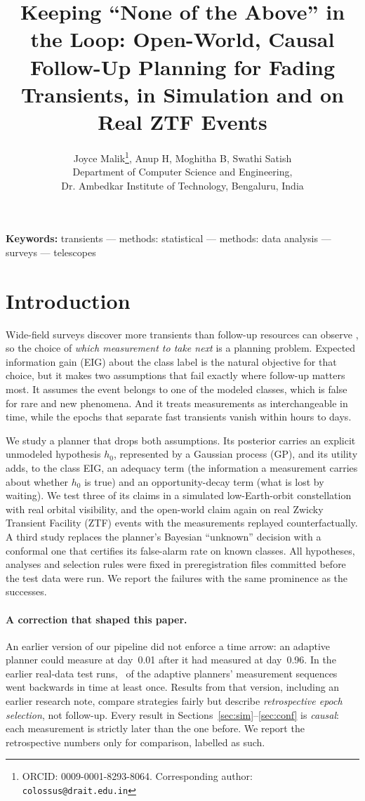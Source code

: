 \documentclass[12pt]{article}
\title{Keeping ``None of the Above'' in the Loop: Open-World, Causal Follow-Up Planning for Fading Transients, in Simulation and on Real ZTF Events}
\author{Joyce Malik\thanks{ORCID: 0009-0001-8293-8064. Corresponding author: \texttt{colossus@drait.edu.in}}, Anup H, Moghitha B, Swathi Satish\\[2pt]
\small Department of Computer Science and Engineering,\\ \small Dr. Ambedkar Institute of Technology, Bengaluru, India}
\date{}
\begin{document}
\maketitle



\noindent\textbf{Keywords:} transients --- methods: statistical --- methods: data analysis --- surveys --- telescopes

\section{Introduction}
Wide-field surveys discover more transients than follow-up resources can observe \citep{Bellm2019,Ivezic2019}, so the choice of \emph{which measurement to take next} is a planning problem. Expected information gain (EIG) about the class label \citep{Lindley1956,Chaloner1995} is the natural objective for that choice, but it makes two assumptions that fail exactly where follow-up matters most. It assumes the event belongs to one of the modeled classes, which is false for rare and new phenomena. And it treats measurements as interchangeable in time, while the epochs that separate fast transients vanish within hours to days.

We study a planner that drops both assumptions. Its posterior carries an explicit unmodeled hypothesis $h_0$, represented by a Gaussian process (GP), and its utility adds, to the class EIG, an adequacy term (the information a measurement carries about whether $h_0$ is true) and an opportunity-decay term (what is lost by waiting). We test three of its claims in a simulated low-Earth-orbit constellation with real orbital visibility, and the open-world claim again on real Zwicky Transient Facility (ZTF) events with the measurements replayed counterfactually. A third study replaces the planner's Bayesian ``unknown'' decision with a conformal one that certifies its false-alarm rate on known classes. All hypotheses, analyses and selection rules were fixed in preregistration files committed before the test data were run. We report the failures with the same prominence as the successes.

\paragraph{A correction that shaped this paper.} An earlier version of our pipeline did not enforce a time arrow: an adaptive planner could measure at day~0.01 after it had measured at day~0.96. In the earlier real-data test runs, \CausalBugPct\ of the adaptive planners' measurement sequences went backwards in time at least once. Results from that version, including an earlier research note, compare strategies fairly but describe \emph{retrospective epoch selection}, not follow-up. Every result in Sections~\ref{sec:sim}--\ref{sec:conf} is \emph{causal}: each measurement is strictly later than the one before. We report the retrospective numbers only for comparison, labelled as such.
\end{document}

